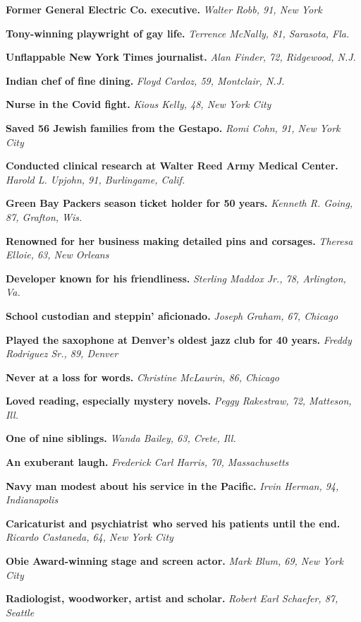 \textbf{Former General Electric Co. executive.} \emph{Walter Robb, 91,
New York}

\textbf{Tony-winning playwright of gay life.} \emph{Terrence McNally,
81, Sarasota, Fla.}

\textbf{Unflappable New York Times journalist.} \emph{Alan Finder, 72,
Ridgewood, N.J.}

\textbf{Indian chef of fine dining.} \emph{Floyd Cardoz, 59, Montclair,
N.J.}

\textbf{Nurse in the Covid fight.} \emph{Kious Kelly, 48, New York City}

\textbf{Saved 56 Jewish families from the Gestapo.} \emph{Romi Cohn, 91,
New York City}

\textbf{Conducted clinical research at Walter Reed Army Medical Center.}
\emph{Harold L. Upjohn, 91, Burlingame, Calif.}

\textbf{Green Bay Packers season ticket holder for 50 years.}
\emph{Kenneth R. Going, 87, Grafton, Wis.}

\textbf{Renowned for her business making detailed pins and corsages.}
\emph{Theresa Elloie, 63, New Orleans}

\textbf{Developer known for his friendliness.} \emph{Sterling Maddox
Jr., 78, Arlington, Va.}

\textbf{School custodian and steppin' aficionado.} \emph{Joseph Graham,
67, Chicago}

\textbf{Played the saxophone at Denver's oldest jazz club for 40 years.}
\emph{Freddy Rodriguez Sr., 89, Denver}

\textbf{Never at a loss for words.} \emph{Christine McLaurin, 86,
Chicago}

\textbf{Loved reading, especially mystery novels.} \emph{Peggy
Rakestraw, 72, Matteson, Ill.}

\textbf{One of nine siblings.} \emph{Wanda Bailey, 63, Crete, Ill.}

\textbf{An exuberant laugh.} \emph{Frederick Carl Harris, 70,
Massachusetts}

\textbf{Navy man modest about his service in the Pacific.} \emph{Irvin
Herman, 94, Indianapolis}

\textbf{Caricaturist and psychiatrist who served his patients until the
end.} \emph{Ricardo Castaneda, 64, New York City}

\textbf{Obie Award-winning stage and screen actor.} \emph{Mark Blum, 69,
New York City}

\textbf{Radiologist, woodworker, artist and scholar.} \emph{Robert Earl
Schaefer, 87, Seattle}

